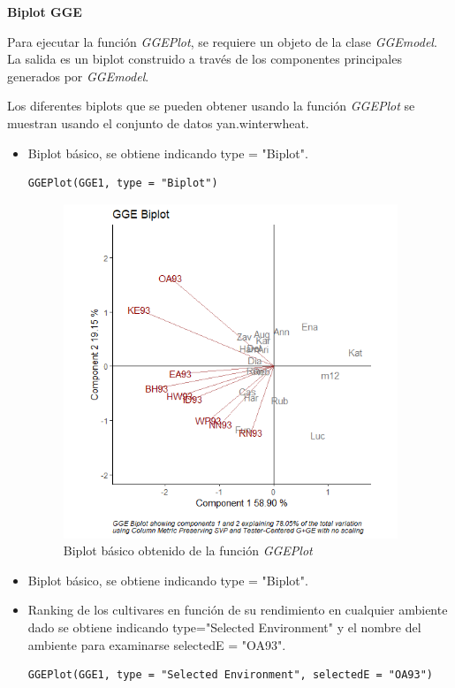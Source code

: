 \textbf{Biplot GGE}

Para ejecutar la función \emph{GGEPlot}, se requiere un objeto de la clase \emph{GGEmodel}. La salida es un biplot construido a través de los componentes principales generados por \emph{GGEmodel}.

Los diferentes biplots que se pueden obtener usando la función \emph{GGEPlot} se muestran usando el conjunto de datos yan.winterwheat.


\begin{itemize}
\item Biplot básico, se obtiene indicando type = "Biplot".

\begin{lstlisting}
GGEPlot(GGE1, type = "Biplot")
\end{lstlisting}

\begin{figure}[h]
	\begin{center}
		\includegraphics[width=10cm]{./Graficos/GGE_BIPLOT.png}
	\end{center}
	\caption{Biplot básico obtenido de la función \emph{GGEPlot}}
\end{figure}

\item Biplot básico, se obtiene indicando type = "Biplot".

\item Ranking de los cultivares en función de su rendimiento en cualquier ambiente dado se obtiene indicando type="Selected Environment" y el nombre del ambiente para examinarse selectedE = "OA93".

\begin{lstlisting}
GGEPlot(GGE1, type = "Selected Environment", selectedE = "OA93")
\end{lstlisting}



\end{itemize}
